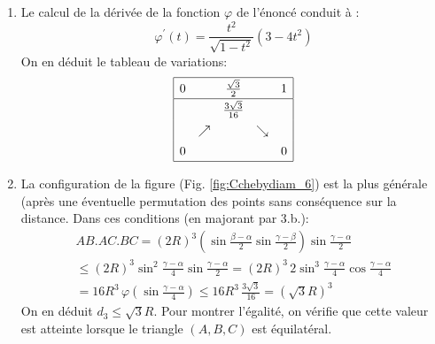 \begin{enumerate}
\begin{enumerate}
\item Le calcul de la dérivée de la fonction $\varphi$ de l'énoncé conduit à :
\begin{displaymath}
 \varphi^\prime(t)=\frac{t^2}{\sqrt{1-t^2}}(3-4t^2)
\end{displaymath}
On en déduit le tableau de variations:
\begin{displaymath}
\renewcommand{\arraystretch}{1.4}
 \begin{array}{|ccccc|}
  \hline
 0 & & \frac{\sqrt{3}}{2}   &          & 1 \\ \hline
   & & \frac{3\sqrt{3}}{16} &          &  \\
   & \nearrow &              & \searrow &  \\
 0 & &  & & 0 \\ \hline
\end{array}
\end{displaymath}
\item La configuration de la figure (Fig. \ref{fig:Cchebydiam_6}) est la plus générale (après une éventuelle permutation des points sans conséquence sur la distance. Dans ces conditions (en majorant par 3.b.):
\begin{multline*}
 AB.AC.BC = (2R)^3 \left( \sin\frac{\beta - \alpha}{2} \sin\frac{\gamma - \beta}{2}\right)  \sin\frac{\gamma - \alpha}{2} \\
\leq (2R)^3 \sin^2 \frac{\gamma - \alpha}{4} \sin\frac{\gamma - \alpha}{2}
= (2R)^3\, 2 \sin^3 \frac{\gamma - \alpha}{4} \cos \frac{\gamma - \alpha}{4} \\
= 16 R^3\, \varphi(\sin \frac{\gamma - \alpha}{4}) \leq 16 R^3\, \frac{3\sqrt{3}}{16}
= (\sqrt{3} R)^3
\end{multline*}
On en déduit $d_3\leq \sqrt{3}R$. Pour montrer l'égalité, on vérifie que cette valeur est atteinte lorsque le triangle $(A,B,C)$ est équilatéral.
\end{enumerate}
\end{enumerate}

